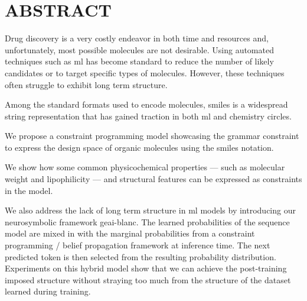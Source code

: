 \documentclass[../Document.tex]{subfiles}
\begin{document}

\chapter*{ABSTRACT}\thispagestyle{headings}

Drug discovery is a very costly endeavor in both time and resources and, unfortunately, most possible molecules are not desirable.
Using automated techniques such as \acrshort{ml} has become standard to reduce the number of likely candidates or to target specific types of molecules.
However, these techniques often struggle to exhibit long term structure.

Among the standard formats used to encode molecules, \acrshort{smiles} is a widespread string representation that has gained traction in both \acrshort{ml} and chemistry circles.

We propose a constraint programming model showcasing the grammar constraint to express the design space of organic molecules using the \acrshort{smiles} notation.

We show how some common physicochemical properties --- such as molecular weight and lipophilicity --- and structural features can be expressed as constraints in the model.

We also address the lack of long term structure in \acrshort{ml} models by introducing our neurosymbolic framework \acrshort{geai-blanc}.
The learned probabilities of the sequence model are mixed in with the marginal probabilities from a constraint programming / belief propagation framework at inference time.
The next predicted token is then selected from the resulting probability distribution.
Experiments on this hybrid model show that we can achieve the post-training imposed structure without straying too much from the structure of the dataset learned during training.
\end{document}
